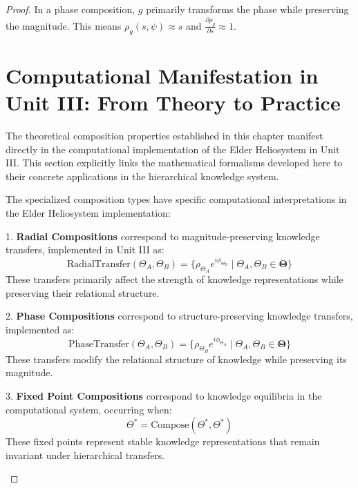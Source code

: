 \begin{proof}
In a phase composition, $g$ primarily transforms the phase while preserving the magnitude. This means $\rho_g(s,\psi) \approx s$ and $\frac{\partial \rho_g}{\partial s} \approx 1$.

\section{Computational Manifestation in Unit III: From Theory to Practice}

The theoretical composition properties established in this chapter manifest directly in the computational implementation of the Elder Heliosystem in Unit III. This section explicitly links the mathematical formalisms developed here to their concrete applications in the hierarchical knowledge system.

\begin{theorem}
\label{thm:specialized_compositions_implementation}
The specialized composition types have specific computational interpretations in the Elder Heliosystem implementation:

1. \textbf{Radial Compositions} correspond to magnitude-preserving knowledge transfers, implemented in Unit III as:
\begin{equation}
\text{RadialTransfer}(\Theta_A, \Theta_B) = \{\rho_{\Theta_A} e^{i\phi_{\Theta_B}} \mid \Theta_A, \Theta_B \in \boldsymbol{\Theta}\}
\end{equation}
These transfers primarily affect the strength of knowledge representations while preserving their relational structure.

2. \textbf{Phase Compositions} correspond to structure-preserving knowledge transfers, implemented as:
\begin{equation}
\text{PhaseTransfer}(\Theta_A, \Theta_B) = \{\rho_{\Theta_B} e^{i\phi_{\Theta_A}} \mid \Theta_A, \Theta_B \in \boldsymbol{\Theta}\}
\end{equation}
These transfers modify the relational structure of knowledge while preserving its magnitude.

3. \textbf{Fixed Point Compositions} correspond to knowledge equilibria in the computational system, occurring when:
\begin{equation}
\Theta^* = \text{Compose}(\Theta^*, \Theta^*)
\end{equation}
These fixed points represent stable knowledge representations that remain invariant under hierarchical transfers.
\end{theorem}


\end{proof}
